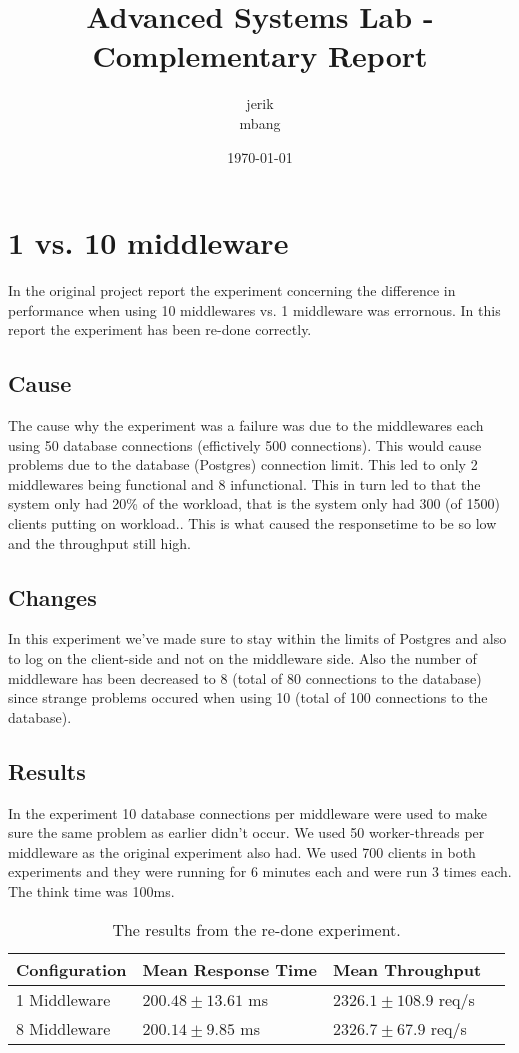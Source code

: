 \documentclass[a4paper, 11pt]{article}
\title{Advanced Systems Lab - Complementary Report}
\author{jerik\\mbang\\}
\date{\today}
\begin{document}
\maketitle

\section{1 vs. 10 middleware}
In the original project report the experiment concerning the difference in performance when using 10 middlewares vs. 1 middleware was errornous. In this report the experiment has been re-done correctly.

\subsection{Cause}
The cause why the experiment was a failure was due to the middlewares each using 50 database connections (effictively 500 connections). 
This would cause problems due to the database (Postgres) connection limit. 
This led to only 2 middlewares being functional and 8 infunctional. This in turn led to that the system only had 20\% of the workload, that is the system only had 300 (of 1500) clients putting on workload.. This is what caused the responsetime to be so low and the throughput still high.\\

\subsection{Changes}
In this experiment we've made sure to stay within the limits of Postgres and also to log on the client-side and not on the middleware side. Also the number of middleware has been decreased to 8 (total of 80 connections to the database) since strange problems occured when using 10 (total of 100 connections to the database).

\subsection{Results}
In the experiment 10 database connections per middleware were used to make sure the same problem as earlier didn't occur. We used 50 worker-threads per middleware as the original experiment also had. We used 700 clients in both experiments and they were running for 6 minutes each and were run 3 times each. The think time was 100ms.

\begin{table}[!htbp]
\centering
    \begin{tabular}{|l|l|l|l|}
    \hline
    Configuration 	& Mean Response Time 			& 	Mean Throughput\\ \hline
    1 Middleware  	& $200.48 \pm 13.61$ ms       	&   $2326.1 \pm 108.9$ req/s  \\ \hline
    8 Middleware 	& $200.14 \pm 9.85$  ms       	&   $2326.7 \pm 67.9$ req/s  \\ \hline
    \end{tabular}
    \label{table}
    \caption{The results from the re-done experiment.}
\end{table}
\FloatBarrier %
\end{document}
